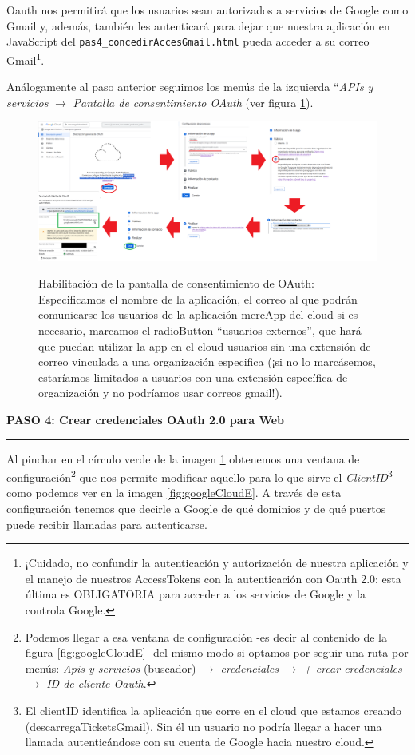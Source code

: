 \documentclass[a4paper,12pt]{report}
\begin{document}
	Oauth nos permitirá que los usuarios sean autorizados a servicios de Google como Gmail y, además, también les autenticará para dejar que nuestra aplicación en JavaScript del \texttt{pas4\_concedirAccesGmail.html} pueda acceder a su correo Gmail\footnote{¡Cuidado, no confundir la autenticación y autorización de nuestra aplicación y el manejo de nuestros AccessTokens con la autenticación con Oauth 2.0: esta última es OBLIGATORIA para acceder a los servicios de Google y la controla Google.}.
	
	Análogamente al paso anterior seguimos los menús de la izquierda ``\textit{APIs y servicios} $\rightarrow$ \textit{Pantalla de consentimiento OAuth} (ver figura \ref{fig:googleCloudD}).
	
	\FloatBarrier
	\setlength{\belowcaptionskip}{3pt}
	\begin{figure}[H]
		\centering
		\caption{Habilitación de la pantalla de consentimiento de OAuth: Especificamos el nombre de la aplicación, el correo al que podrán comunicarse los usuarios de la aplicación mercApp del cloud si es necesario, marcamos el radioButton ``usuarios externos'', que hará que puedan utilizar la app en el cloud usuarios sin una extensión de correo vinculada a una organización especifica (¡si no lo marcásemos, estaríamos limitados a usuarios con una extensión específica de organización y no podríamos usar correos gmail!).}
		\includegraphics[width=1\linewidth]{img/googleCloudD.png}
		\label{fig:googleCloudD}
	\end{figure}
	\FloatBarrier
	
	\noindent \textbf{PASO 4: Crear credenciales OAuth 2.0 para Web}
	\vspace{.1em}
	\hrule
	\vspace{.5em}
	
	Al pinchar en el círculo verde de la imagen \ref{fig:googleCloudD} obtenemos una ventana de configuración\footnote{Podemos llegar a esa ventana de configuración -es decir al contenido de la figura \ref{fig:googleCloudE}- del mismo modo si optamos por seguir una ruta por menús: \textit{Apis y servicios} (buscador) $\rightarrow$ \textit{credenciales} $\rightarrow$ \textit{+ crear credenciales} $\rightarrow$ \textit{ID de cliente Oauth}.} que nos permite modificar aquello para lo que sirve el \textit{ClientID}\footnote{El clientID identifica la aplicación que corre en el cloud que estamos creando (descarregaTicketsGmail). Sin él un usuario no podría llegar a hacer una llamada autenticándose con su cuenta de Google hacia nuestro cloud.} como podemos ver en la imagen \ref{fig:googleCloudE}. A través de esta configuración tenemos que decirle a Google de qué dominios y de qué puertos puede recibir llamadas para autenticarse.
	
\end{document}

